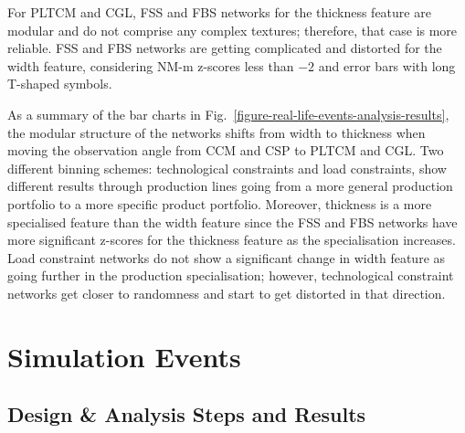 For PLTCM and CGL, FSS and FBS networks for the thickness feature are modular and do not comprise any complex textures; therefore, that case is more reliable. FSS and FBS networks are getting complicated and distorted for the width feature, considering NM-m z-scores less than $-2$ and error bars with long T-shaped symbols.

As a summary of the bar charts in Fig.~\ref{figure-real-life-events-analysis-results}, the modular structure of the networks shifts from width to thickness when moving the observation angle from CCM and CSP to PLTCM and CGL. {\color{red}Two different binning schemes: technological constraints and load constraints, show different results through production lines going from a more general production portfolio to a more specific product portfolio}. Moreover, thickness is a more specialised feature than the width feature since the FSS and FBS networks have more significant z-scores for the thickness feature as the specialisation increases. {\color{red}Load constraint networks} do not show a significant change in width feature as going further in the production specialisation; however, {\color{red}technological constraint networks} get closer to randomness and start to get distorted in that direction.
\clearpage

\section{Simulation Events}
\subsection*{Design \& Analysis Steps and Results}
%

